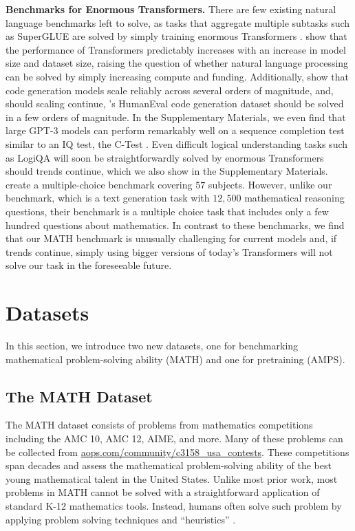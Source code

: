 \textbf{Benchmarks for Enormous Transformers.}\quad
There are few existing natural language benchmarks left to solve, as tasks that aggregate multiple subtasks such as SuperGLUE \citep{Wang2019SuperGLUEAS} are solved by simply training enormous Transformers \citep{He2020DeBERTaDB}.
\citet{Kaplan2020ScalingLF, Henighan2020ScalingLF} show that the performance of Transformers predictably increases with an increase in model size and dataset size, raising the question of whether natural language processing can be solved by simply increasing compute and funding. Additionally, \citet{Chen2021EvaluatingLL,Austin2021ProgramSW} show that code generation models scale reliably across several orders of magnitude, and, should scaling continue, \citet{Chen2021EvaluatingLL}'s HumanEval code generation dataset should be solved in a few orders of magnitude. In the Supplementary Materials, we even find that large GPT-3 models can perform remarkably well on a sequence completion test similar to an IQ test, the C-Test \citep{ctest,Legg2007UniversalIA}. Even difficult logical understanding tasks such as LogiQA \citep{Liu2020LogiQAAC} will soon be straightforwardly solved by enormous Transformers should trends continue, which we also show in the Supplementary Materials. 
\citet{Hendrycks2020MeasuringMM} create a multiple-choice benchmark covering $57$ subjects. However, unlike our benchmark, which is a text generation task with $12,500$ mathematical reasoning questions, their benchmark is a multiple choice task that includes only a few hundred questions about mathematics. In contrast to these benchmarks, we find that our MATH benchmark is unusually challenging for current models and, if trends continue, simply using bigger versions of today's Transformers will not solve our task in the foreseeable future.

\section{Datasets}

In this section, we introduce two new datasets, one for benchmarking mathematical problem-solving ability (MATH) and one for pretraining (AMPS).

\subsection{The MATH Dataset}\label{subsec:math}
The MATH dataset consists of problems from mathematics competitions including the AMC 10, AMC 12, AIME, and more. Many of these problems can be collected from \href{https://artofproblemsolving.com/community/c3158_usa_contests}{aops.com/community/c3158\_usa\_contests}. These competitions span decades and assess the mathematical problem-solving ability of the best young mathematical talent in the United States. Unlike most prior work, most problems in MATH cannot be solved with a straightforward application of standard K-12 mathematics tools. Instead, humans often solve such problem by applying problem solving techniques and ``heuristics'' \citep{Polya1945HowTS}.

